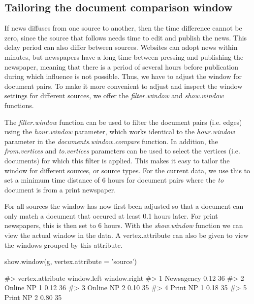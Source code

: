 \subsection{Tailoring the document comparison window}

If news diffuses from one source to another, then the time difference cannot be zero, since the source that follows needs time to edit and publish the news. 
This delay period can also differ between sources.
Websites can adopt news within minutes, but newspapers have a long time between pressing and publishing the newspaper, meaning that there is a period of several hours before publication during which influence is not possible.
Thus, we have to adjust the window for document pairs. 
To make it more convenient to adjust and inspect the window settings for different sources, we offer the \emph{filter.window} and \emph{show.window} functions.

The \emph{filter.window} function can be used to filter the document pairs (i.e. edges) using the \emph{hour.window} parameter, which works identical to the \emph{hour.window} parameter in the \emph{documents.window.compare} function. 
In addition, the \emph{from.vertices} and \emph{to.vertices} parameters can be used to select the vertices (i.e. documents) for which this filter is applied.
This makes it easy to tailor the window for different sources, or source types.
For the current data, we use this to set a minimum time distance of 6 hours for document pairs where the \emph{to} document is from a print newspaper. 

\begin{Schunk}
\end{Schunk}

For all sources the window has now first been adjusted so that a
document can only match a document that occured at least 0.1 hours
later. For print newspapers, this is then set to 6 hours. With the
\emph{show.window} function we can view the actual window in the data. A
vertex.attribute can also be given to view the windows grouped by this
attribute.

\begin{Schunk}
\begin{Sinput}
show.window(g, vertex.attribute = 'source')
\end{Sinput}
\begin{Soutput}
#>   vertex.attribute window.left window.right
#> 1       Newsagency        0.12           36
#> 2      Online NP 1        0.12           36
#> 3      Online NP 2        0.10           35
#> 4       Print NP 1        0.18           35
#> 5       Print NP 2        0.80           35
\end{Soutput}
\end{Schunk}

